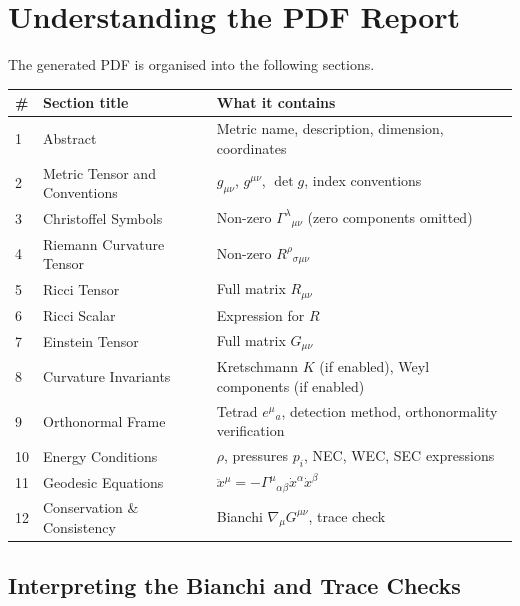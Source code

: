 \documentclass[11pt,a4paper]{article}
\renewcommand{\Gamma}{\varGamma}
\begin{document}
\section{Understanding the PDF Report}
\label{sec:report}

The generated PDF is organised into the following sections.

\begin{center}
\begin{longtable}{lll}
  \toprule
  \# & Section title & What it contains \\
  \midrule\endhead
  1 & Abstract
    & Metric name, description, dimension, coordinates \\
  2 & Metric Tensor and Conventions
    & $g_{\mu\nu}$, $g^{\mu\nu}$, $\det g$, index conventions \\
  3 & Christoffel Symbols
    & Non-zero $\Gamma^\lambda{}_{\mu\nu}$ (zero components omitted) \\
  4 & Riemann Curvature Tensor
    & Non-zero $R^\rho{}_{\sigma\mu\nu}$ \\
  5 & Ricci Tensor
    & Full matrix $R_{\mu\nu}$ \\
  6 & Ricci Scalar
    & Expression for $R$ \\
  7 & Einstein Tensor
    & Full matrix $G_{\mu\nu}$ \\
  8 & Curvature Invariants
    & Kretschmann $K$ (if enabled), Weyl components (if enabled) \\
  9 & Orthonormal Frame
    & Tetrad $e^\mu{}_a$, detection method, orthonormality verification \\
  10 & Energy Conditions
    & $\rho$, pressures $p_i$, NEC, WEC, SEC expressions \\
  11 & Geodesic Equations
    & $\ddot{x}^\mu = -\Gamma^\mu{}_{\alpha\beta}\dot{x}^\alpha\dot{x}^\beta$ \\
  12 & Conservation \& Consistency
    & Bianchi $\nabla_\mu G^{\mu\nu}$, trace check \\
  \bottomrule
\end{longtable}
\end{center}

\subsection*{Interpreting the Bianchi and Trace Checks}
\end{document}
